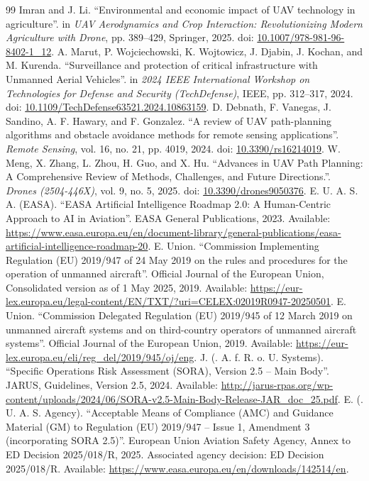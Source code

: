 \documentclass[a4paper,11pt]{article}
\begin{document}
\begin{thebibliography}{99}
Imran and J. Li. ``Environmental and economic impact of UAV technology in agriculture''. in \emph{UAV Aerodynamics and Crop Interaction: Revolutionizing Modern Agriculture with Drone}, pp. 389--429, Springer, 2025. doi: \url{10.1007/978-981-96-8402-1_12}.
A. Marut, P. Wojciechowski, K. Wojtowicz, J. Djabin, J. Kochan, and M. Kurenda. ``Surveillance and protection of critical infrastructure with Unmanned Aerial Vehicles''. in \emph{2024 IEEE International Workshop on Technologies for Defense and Security (TechDefense)}, IEEE, pp. 312--317, 2024. doi: \url{10.1109/TechDefense63521.2024.10863159}.
D. Debnath, F. Vanegas, J. Sandino, A. F. Hawary, and F. Gonzalez. ``A review of UAV path-planning algorithms and obstacle avoidance methods for remote sensing applications''. \emph{Remote Sensing}, vol. 16, no. 21, pp. 4019, 2024. doi: \url{10.3390/rs16214019}.
W. Meng, X. Zhang, L. Zhou, H. Guo, and X. Hu. ``Advances in UAV Path Planning: A Comprehensive Review of Methods, Challenges, and Future Directions.''. \emph{Drones (2504-446X)}, vol. 9, no. 5, 2025. doi: \url{10.3390/drones9050376}.
E. U. A. S. A. (EASA). ``EASA Artificial Intelligence Roadmap 2.0: A Human-Centric Approach to AI in Aviation''. EASA General Publications, 2023. Available: \url{https://www.easa.europa.eu/en/document-library/general-publications/easa-artificial-intelligence-roadmap-20}.
E. Union. ``Commission Implementing Regulation (EU) 2019/947 of 24 May 2019 on the rules and procedures for the operation of unmanned aircraft''. Official Journal of the European Union, Consolidated version as of 1 May 2025, 2019. Available: \url{https://eur-lex.europa.eu/legal-content/EN/TXT/?uri=CELEX:02019R0947-20250501}.
E. Union. ``Commission Delegated Regulation (EU) 2019/945 of 12 March 2019 on unmanned aircraft systems and on third-country operators of unmanned aircraft systems''. Official Journal of the European Union, 2019. Available: \url{https://eur-lex.europa.eu/eli/reg_del/2019/945/oj/eng}.
J. (. A. f. R. o. U. Systems). ``Specific Operations Risk Assessment (SORA), Version 2.5 -- Main Body''. JARUS, Guidelines, Version 2.5, 2024. Available: \url{http://jarus-rpas.org/wp-content/uploads/2024/06/SORA-v2.5-Main-Body-Release-JAR_doc_25.pdf}.
E. (. U. A. S. Agency). ``Acceptable Means of Compliance (AMC) and Guidance Material (GM) to Regulation (EU) 2019/947 – Issue 1, Amendment 3 (incorporating SORA 2.5)''. European Union Aviation Safety Agency, Annex to ED Decision 2025/018/R, 2025. Associated agency decision: ED Decision 2025/018/R. Available: \url{https://www.easa.europa.eu/en/downloads/142514/en}.

\end{thebibliography}
\end{document}
